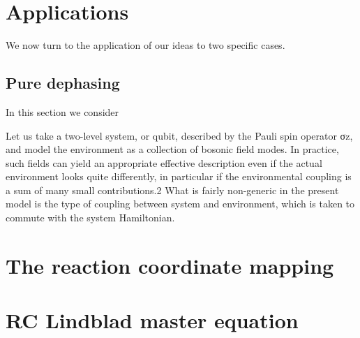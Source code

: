 \documentclass[%
preprint,
onecolumn,
notitlepag,
 amsmath,amssymb,
 aps,
 pra,
]{revtex4-2}
\begin{document}
\section{Applications}

We now turn to the application of our ideas to two specific cases. 

\cite{IlesSmith:2014db}

\subsection{Pure dephasing}

In this section we consider 

Let us take a two-level system, or qubit, described by the Pauli spin operator σz, and model the environment as a collection of bosonic field modes. In practice, such fields can yield an appropriate effective description even if the actual environment looks quite differently, in particular if the environmental coupling is a sum of many small contributions.2 What is fairly non-generic in the present model is the type of coupling between system and environment, which is taken to commute with the system Hamiltonian.


\appendix
\section{The reaction coordinate mapping}
\label{A:RCmap}

\section{RC Lindblad master equation}
\label{B:LME}

%


%
\end{document}
